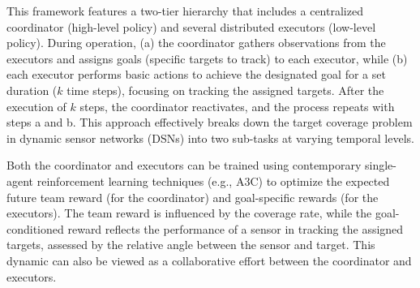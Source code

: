 \documentclass[preprint,12pt]{elsarticle}
\begin{document}
This framework features a two-tier hierarchy that includes a centralized coordinator (high-level policy) and several distributed executors (low-level policy). During operation, (a) the coordinator gathers observations from the executors and assigns goals (specific targets to track) to each executor, while (b) each executor performs basic actions to achieve the designated goal for a set duration ($k$ time steps), focusing on tracking the assigned targets. After the execution of $k$ steps, the coordinator reactivates, and the process repeats with steps a and b. This approach effectively breaks down the target coverage problem in dynamic sensor networks (DSNs) into two sub-tasks at varying temporal levels.
%     

Both the coordinator and executors can be trained using contemporary single-agent reinforcement learning techniques (e.g., A3C) to optimize the expected future team reward (for the coordinator) and goal-specific rewards (for the executors). The team reward is influenced by the coverage rate, while the goal-conditioned reward reflects the performance of a sensor in tracking the assigned targets, assessed by the relative angle between the sensor and target. This dynamic can also be viewed as a collaborative effort between the coordinator and executors.

\end{document}
